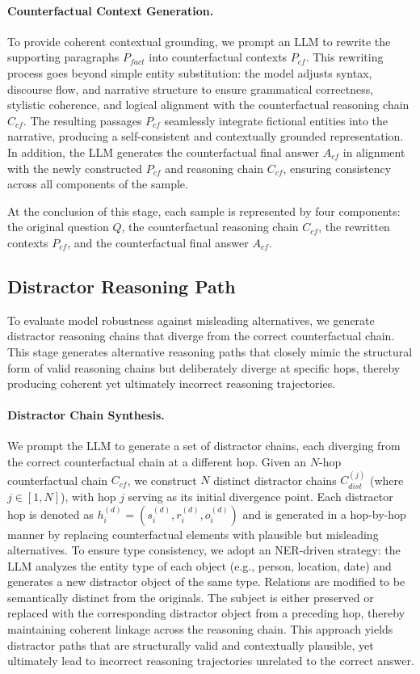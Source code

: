 \documentclass[10pt, a4paper]{article}
\begin{document}
\paragraph{Counterfactual Context Generation.} To provide coherent contextual grounding, we prompt an LLM to rewrite the supporting paragraphs $P_{fact}$ into counterfactual contexts $P_{cf}$. This rewriting process goes beyond simple entity substitution: the model adjusts syntax, discourse flow, and narrative structure to ensure grammatical correctness, stylistic coherence, and logical alignment with the counterfactual reasoning chain $C_{cf}$. The resulting passages $P_{cf}$ seamlessly integrate fictional entities into the narrative, producing a self-consistent and contextually grounded representation. In addition, the LLM generates the counterfactual final answer $A_{cf}$ in alignment with the newly constructed $P_{cf}$ and reasoning chain $C_{cf}$, ensuring consistency across all components of the sample. 

At the conclusion of this stage, each sample is represented by four components: the original question $Q$, the counterfactual reasoning chain $C_{cf}$, the rewritten contexts $P_{cf}$, and the counterfactual final answer $A_{cf}$.

\subsection{Distractor Reasoning Path}
To evaluate model robustness against misleading alternatives, we generate distractor reasoning chains that diverge from the correct counterfactual chain. This stage generates alternative reasoning paths that closely mimic the structural form of valid reasoning chains but deliberately diverge at specific hops, thereby producing coherent yet ultimately incorrect reasoning trajectories.



\paragraph{Distractor Chain Synthesis.} 
We prompt the LLM to generate a set of distractor chains, each diverging from the correct counterfactual chain at a different hop. Given an $N$-hop counterfactual chain $C_{cf}$, we construct $N$ distinct distractor chains $C_{dist}^{(j)}$ (where $j \in [1,N]$), with hop $j$ serving as its initial divergence point. Each distractor hop is denoted as $h_i^{(d)}=(s_i^{(d)}, r_i^{(d)}, o_i^{(d)})$ and is generated in a hop-by-hop manner by replacing counterfactual elements with plausible but misleading alternatives. To ensure type consistency, we adopt an NER-driven strategy: the LLM analyzes the entity type of each object (e.g., person, location, date) and generates a new distractor object of the same type. Relations are modified to be semantically distinct from the originals. The subject is either preserved or replaced with the corresponding distractor object from a preceding hop, thereby maintaining coherent linkage across the reasoning chain. This approach yields distractor paths that are structurally valid and contextually plausible, yet ultimately lead to incorrect reasoning trajectories unrelated to the correct answer.
\end{document}
